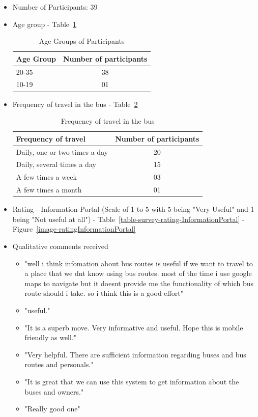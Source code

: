\begin {itemize}

\item Number of Participants: 39

\item Age group - Table~\ref{table-survey-ageGroupOfSurveyParticipants}

\begin{table} [h]
\centering
\begin{tabular}{|l|c|}
\hline
Age Group & Number of participants \\
\hline
20-35	&38 \\
10-19	&01 \\
\hline
\end{tabular}
\caption{Age Groups of Participants}
\label{table-survey-ageGroupOfSurveyParticipants}
\end{table}

\item Frequency of travel in the bus - Table~\ref{table-survey-frequencyOfTravelInTheBus}

\begin{table} [h]
\centering
\begin{tabular}{|l|c|}
\hline
Frequency of travel & Number of participants \\
\hline
Daily, one or two times a day	&20 \\
Daily, several times a day	&15 \\
A few times a week	&03 \\
A few times a month	&01 \\
\hline
\end{tabular}
\caption{Frequency of travel in the bus}
\label{table-survey-frequencyOfTravelInTheBus}
\end{table}

\item Rating - Information Portal (Scale of 1 to 5 with 5 being "Very Useful" and 1 being "Not useful at all") - Table~\ref{table-survey-rating-InformationPortal} - Figure~\ref{image-ratingInformationPortal}

\item Qualitative comments received
\begin {itemize}
\item "well i think infomation about bus routes is useful if we want to travel to a place that we dnt know using bus routes. most of the time i use google maps to navigate but it doesnt provide me the functionality of which bus route should i take. so i think this is a good effort"
\item "useful."
\item "It is a superb move. Very informative and useful. Hope this is mobile friendly as well."
\item "Very helpful. There are sufficient information regarding buses and bus routes and personals."
\item "It is great that we can use this system to get information about the buses and owners."
\item "Really good one"
\end {itemize}


\end{itemize}
